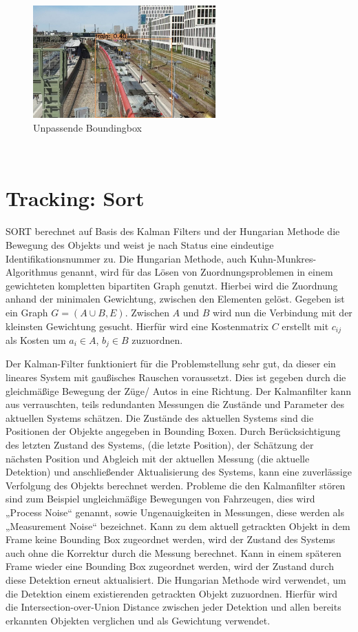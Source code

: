 \documentclass[conference]{IEEEtran}
\begin{document}
	\begin{figure}[!h]
		\begin{center}
			\includegraphics[width=7cm]{Media/Output_2126.jpg}
			\caption{Unpassende Boundingbox}
			\label{UB4}
		\end{center}
	\end{figure}\\
	
	
	\section{Tracking: Sort}
	SORT berechnet auf Basis des Kalman Filters und der Hungarian Methode die Bewegung des Objekts und weist je nach Status eine eindeutige Identifikationsnummer zu. Die Hungarian Methode, auch Kuhn-Munkres-Algorithmus genannt, wird für das Lösen von Zuordnungsproblemen in einem gewichteten kompletten bipartiten Graph genutzt. Hierbei wird die Zuordnung anhand der minimalen Gewichtung, zwischen den Elementen gelöst. Gegeben ist ein Graph $G = (A \cup B, E) $. Zwischen $A$ und $B$ wird nun die Verbindung mit der kleinsten Gewichtung gesucht. Hierfür wird eine Kostenmatrix $C$ erstellt mit $c_{ij}$ als Kosten um $a_i \in A$, $b_j \in B$ zuzuordnen. 
	
	Der Kalman-Filter funktioniert für die Problemstellung sehr gut, da dieser ein lineares System mit gaußisches Rauschen voraussetzt. Dies ist gegeben durch die gleichmäßige Bewegung der Züge/ Autos in eine Richtung.
	Der Kalmanfilter kann aus verrauschten, teils redundanten Messungen die Zustände und Parameter des aktuellen Systems schätzen. 
	Die Zustände des aktuellen Systems sind die Positionen der Objekte angegeben in Bounding Boxen. Durch Berücksichtigung des letzten Zustand des Systems, (die letzte Position), der Schätzung der nächsten Position und Abgleich mit der aktuellen Messung (die aktuelle Detektion) und anschließender Aktualisierung des Systems, kann eine zuverlässige Verfolgung des Objekts berechnet werden. Probleme die den Kalmanfilter stören sind zum Beispiel ungleichmäßige Bewegungen von Fahrzeugen, dies wird „Process Noise“ genannt, sowie Ungenauigkeiten in Messungen, diese werden als „Measurement Noise“ bezeichnet.
	Kann zu dem aktuell getrackten Objekt in dem Frame keine Bounding Box zugeordnet werden, wird der Zustand des Systems auch ohne die Korrektur durch die Messung berechnet. Kann in einem späteren Frame wieder eine Bounding Box zugeordnet werden, wird der Zustand durch diese Detektion erneut aktualisiert. 
	Die Hungarian Methode wird verwendet, um die Detektion einem existierenden getrackten Objekt zuzuordnen. Hierfür wird die Intersection-over-Union Distance zwischen jeder Detektion und allen bereits erkannten Objekten verglichen und als Gewichtung verwendet.
	
\end{document}
